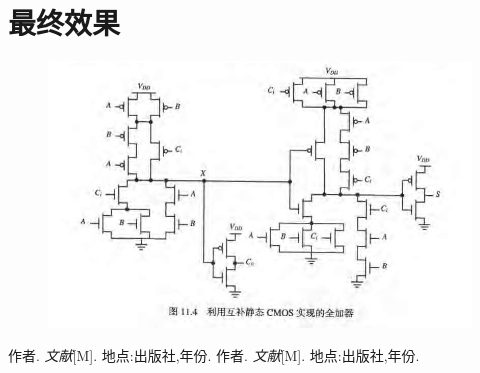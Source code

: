 \documentclass[12pt, a4paper, oneside]{ctexbook}
\begin{document}
	
		

		\chapter{最终效果}
	

	
	
	\begin{figure}[h]
		\centering
		\includegraphics[scale=0.5]{test.png}
	\end{figure}

	\newpage	
	\begin{thebibliography}{99}
		作者. \emph{文献}[M]. 地点:出版社,年份.
		作者. \emph{文献}[M]. 地点:出版社,年份.
	\end{thebibliography}
	
	
\end{document}
